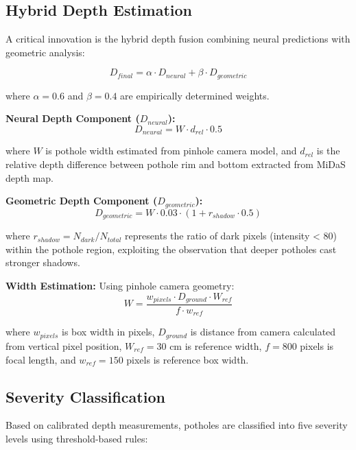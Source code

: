 \documentclass[conference]{IEEEtran}
\begin{document}
\subsection{Hybrid Depth Estimation}

A critical innovation is the hybrid depth fusion combining neural predictions with geometric analysis:

\begin{equation}
D_{final} = \alpha \cdot D_{neural} + \beta \cdot D_{geometric}
\end{equation}

where $\alpha = 0.6$ and $\beta = 0.4$ are empirically determined weights.

\textbf{Neural Depth Component ($D_{neural}$):}
\begin{equation}
D_{neural} = W \cdot d_{rel} \cdot 0.5
\end{equation}

where $W$ is pothole width estimated from pinhole camera model, and $d_{rel}$ is the relative depth difference between pothole rim and bottom extracted from MiDaS depth map.

\textbf{Geometric Depth Component ($D_{geometric}$):}
\begin{equation}
D_{geometric} = W \cdot 0.03 \cdot (1 + r_{shadow} \cdot 0.5)
\end{equation}

where $r_{shadow} = N_{dark} / N_{total}$ represents the ratio of dark pixels (intensity < 80) within the pothole region, exploiting the observation that deeper potholes cast stronger shadows.

\textbf{Width Estimation:}
Using pinhole camera geometry:
\begin{equation}
W = \frac{w_{pixels} \cdot D_{ground} \cdot W_{ref}}{f \cdot w_{ref}}
\end{equation}

where $w_{pixels}$ is box width in pixels, $D_{ground}$ is distance from camera calculated from vertical pixel position, $W_{ref} = 30$ cm is reference width, $f = 800$ pixels is focal length, and $w_{ref} = 150$ pixels is reference box width.

\subsection{Severity Classification}

Based on calibrated depth measurements, potholes are classified into five severity levels using threshold-based rules:
\end{document}
